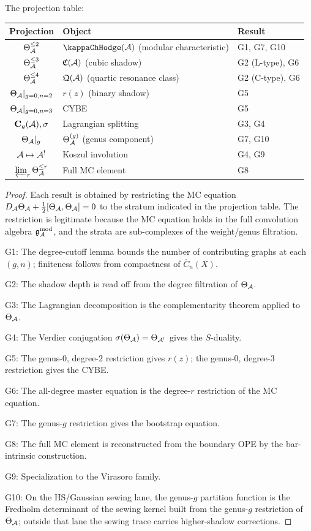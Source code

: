 The projection table:

\begin{center}
\renewcommand{\arraystretch}{1.3}
\small
\begin{tabular}{cll}
\textbf{Projection} & \textbf{Object} & \textbf{Result} \\
\hline
$\Theta_{\mathcal{A}}^{\le 2}$ & $\kappaChHodge(\cA)$ (modular characteristic)
 & G1, G7, G10 \\
$\Theta_{\mathcal{A}}^{\le 3}$ & $\mathfrak{C}(\mathcal{A})$ (cubic shadow)
 & G2 (L-type), G6 \\
$\Theta_{\mathcal{A}}^{\le 4}$ & $\mathfrak{Q}(\mathcal{A})$ (quartic resonance class)
 & G2 (C-type), G6 \\
$\Theta_{\mathcal{A}}|_{g=0,n=2}$ & $r(z)$ (binary shadow)
 & G5 \\
$\Theta_{\mathcal{A}}|_{g=0,n=3}$ & CYBE
 & G5 \\
$\mathbf{C}_g(\mathcal{A}), \sigma$ & Lagrangian splitting
 & G3, G4 \\
$\Theta_{\mathcal{A}}|_g$ & $\Theta_{\mathcal{A}}^{(g)}$ (genus component)
 & G7, G10 \\
$\mathcal{A} \mapsto \mathcal{A}^!$ & Koszul involution
 & G4, G9 \\
$\varprojlim_r \Theta_{\mathcal{A}}^{\le r}$ & Full MC element
 & G8
\end{tabular}
\end{center}

\begin{proof}
Each result is obtained by restricting the MC equation
$D_{\mathcal{A}}\Theta_{\mathcal{A}} + \frac{1}{2}[\Theta_{\mathcal{A}}, \Theta_{\mathcal{A}}] = 0$
to the stratum indicated in the projection table. The restriction
is legitimate because the MC equation holds in the full
convolution algebra $\mathfrak{g}_{\mathcal{A}}^{\mathrm{mod}}$, and the strata are sub-complexes
of the weight/genus filtration.

G1: The degree-cutoff lemma bounds the number of contributing graphs
at each $(g,n)$; finiteness follows from compactness of
$\overline{C}_n(X)$.

G2: The shadow depth is read off from the degree filtration of
$\Theta_{\mathcal{A}}$.

G3: The Lagrangian decomposition is the complementarity theorem
applied to $\Theta_{\mathcal{A}}$.

G4: The Verdier conjugation $\sigma(\Theta_{\mathcal{A}}) = \Theta_{\mathcal{A}^!}$
gives the $S$-duality.

G5: The genus-$0$, degree-$2$ restriction gives $r(z)$; the
genus-$0$, degree-$3$ restriction gives the CYBE.

G6: The all-degree master equation is the degree-$r$ restriction
of the MC equation.

G7: The genus-$g$ restriction gives the bootstrap equation.

G8: The full MC element is reconstructed from the boundary OPE by
the bar-intrinsic construction.

G9: Specialization to the Virasoro family.

G10: On the HS/Gaussian sewing lane, the genus-$g$ partition function
is the Fredholm determinant of the sewing kernel built from the
genus-$g$ restriction of $\Theta_{\mathcal{A}}$; outside that lane the sewing
trace carries higher-shadow corrections.
\end{proof}


